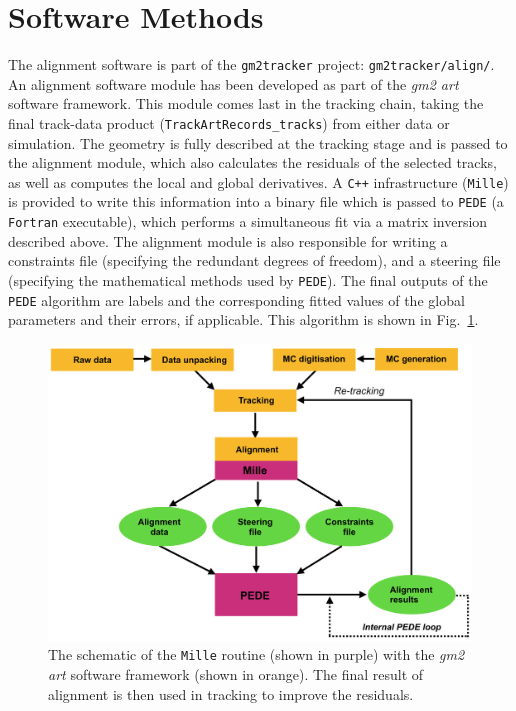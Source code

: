 \documentclass[12pt]{article}
\begin{document}
\section{Software Methods}
The alignment software is part of the \verb!gm2tracker! project: \verb!gm2tracker/align/!. An alignment software module has been developed as part of the \textit{gm2 art} software framework. This module comes last in the tracking chain, taking the final track-data product (\verb!TrackArtRecords_tracks!) from either data or simulation. The geometry is fully described at the tracking stage and is passed to the alignment module, which also calculates the residuals of the selected tracks, as well as computes the local and global derivatives. A \verb!C++! infrastructure (\texttt{Mille}) is provided \cite{mp2} to write this information into a binary file which is passed to \texttt{PEDE} (a \texttt{Fortran} executable), which performs a simultaneous fit via a matrix inversion described above. The alignment module is also responsible for writing a constraints file (specifying the redundant degrees of freedom), and a steering file (specifying the mathematical methods used by \texttt{PEDE}). The final outputs of the \texttt{PEDE} algorithm are labels and the corresponding fitted values of the global parameters and their errors, if applicable. This algorithm is shown in Fig.~\ref{fig:mp2}.\\
\begin{figure}[tbp]
    \centering
    \includegraphics[scale = 0.44]{fig/MP2.png}
    \caption{The schematic of the \texttt{Mille} routine (shown in purple) with the \textit{gm2 art} software framework (shown in orange). The final result of alignment is then used in tracking to improve the residuals.}
    \label{fig:mp2}
\end{figure}
\end{document}
